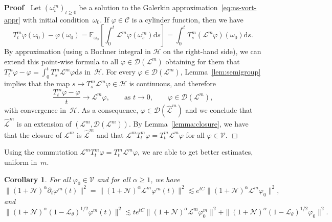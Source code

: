 \documentclass{article}
\newcommand{\mathd}{\mathrm{d}}
\newenvironment{proof}{\noindent\textbf{Proof\ }}{\hspace*{\fill}$\Box$\medskip}
\newtheorem{corollary}{Corollary}
\begin{document}
\begin{proof}
  Let $(\omega^m_t)_{t \geqslant 0}$ be a solution to the Galerkin
  approximation~{\eqref{eq:ns-vort-appr}} with initial condition~$\omega_0$.
  If $\varphi \in \mathcal{C}$ is a cylinder function, then we have
  \[ T^m_t \varphi (\omega_0) - \varphi (\omega_0) =\mathbb{E}_{\omega_0}
     \left[ \int_0^t \mathcal{L}^m \varphi (\omega^m_s) \mathd s \right] =
     \int_0^t T^m_s (\mathcal{L}^m \varphi) (\omega_0) \mathd s. \]
  By approximation (using a Bochner integral in $\mathcal{H}$ on the
  right-hand side), we can extend this point-wise formula to all $\varphi \in
  \mathcal{D} (\mathcal{L}^m)$ obtaining for them that $T^m_t \varphi -
  \varphi = \int_0^t T^m_s \mathcal{L}^m \varphi \mathd s$ in~$\mathcal{H}$.
  For every $\varphi \in \mathcal{D} (\mathcal{L}^m)$,
  Lemma~\ref{lem:semigroup} implies that the map $s \mapsto T^m_s
  \mathcal{L}^m \varphi \in \mathcal{H}$ is continuous, and therefore
  \[ \frac{T_t^m \varphi - \varphi}{t} \rightarrow \mathcal{L}^m \varphi,
     \qquad \text{as } t \rightarrow 0, \qquad \varphi \in \mathcal{D}
     (\mathcal{L}^m), \]
  with convergence in~$\mathcal{H}$. As a consequence, $\varphi \in
  \mathcal{D} (\hat{\mathcal{L}}^m)$ and we conclude that
  $\hat{\mathcal{L}}^m$ is an extension of $(\mathcal{L}^m, \mathcal{D}
  (\mathcal{L}^m))$. By Lemma~\ref{lemma:closure}, we have that the closure of
  $\mathcal{L}^m$ is $\hat{\mathcal{L}}^m$ and that $\mathcal{L}^m T^m_t
  \varphi = T^m_t \mathcal{L}^m \varphi$ for all $\varphi \in \mathcal{V}$.
\end{proof}

Using the commutation $\mathcal{L}^m T^m_t \varphi = T^m_t \mathcal{L}^m
\varphi$, we are able to get better estimates, uniform in~$m$.

\begin{corollary}
  \label{cor:est-phi}For all $\varphi_0 \in \mathcal{V}$ and for all $\alpha
  \geqslant 1$, we have
  \begin{equation}
    \| (1 +\mathcal{N})^{\alpha} \partial_t \varphi^m (t) \|^2 = \| (1
    +\mathcal{N})^{\alpha} \mathcal{L}^m \varphi^m (t) \|^2 \lesssim e^{t C}
    \| (1 +\mathcal{N})^{\alpha} \mathcal{L}^m \varphi_0 \|^2,
    \label{eq:ctrl-dtphi}
  \end{equation}
  and
  \begin{equation}
    \| (1 +\mathcal{N})^{\alpha} (1 -\mathcal{L}_{\theta})^{1 / 2} \varphi^m
    (t) \|^2 \lesssim t e^{t C} \| (1 +\mathcal{N})^{\alpha} \mathcal{L}^m
    \varphi^m_0 \|^2 + \| (1 +\mathcal{N})^{\alpha} (1
    -\mathcal{L}_{\theta})^{1 / 2} \varphi_0 \|^2 . \label{eq:ctrl-phi}
  \end{equation}
\end{corollary}
\end{document}
